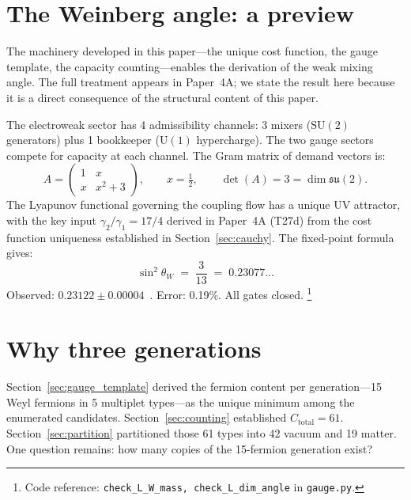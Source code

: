 \documentclass[11pt]{article}
\newcommand{\coderef}[2]{\footnote{Code reference: \texttt{#1} in \texttt{#2}.}}
\newcommand{\SU}{\mathrm{SU}}
\newcommand{\U}{\mathrm{U}}
\begin{document}
\section{The Weinberg angle: a preview}
\label{sec:weinberg}

The machinery developed in this paper---the unique cost function, the gauge template, the capacity counting---enables the derivation of the weak mixing angle.  The full treatment appears in Paper~4A; we state the result here because it is a direct consequence of the structural content of this paper.

The electroweak sector has 4 admissibility channels: 3 mixers ($\SU(2)$ generators) plus 1 bookkeeper ($\U(1)$ hypercharge).  The two gauge sectors compete for capacity at each channel.  The Gram matrix of demand vectors is:
\begin{equation}
A = \begin{pmatrix} 1 & x \\ x & x^2 + 3 \end{pmatrix}, \qquad x = \tfrac{1}{2}, \qquad \det(A) = 3 = \dim\mathfrak{su}(2).
\label{eq:weinberg_matrix}
\end{equation}
The Lyapunov functional governing the coupling flow has a unique UV attractor, with the key input $\gamma_2/\gamma_1 = 17/4$ derived in Paper~4A (T27d) from the cost function uniqueness established in Section~\ref{sec:cauchy}.  The fixed-point formula gives:
\begin{equation}
\sin^2\!\theta_W \;=\; \frac{3}{13} \;=\; 0.23077\ldots
\label{eq:weinberg_value}
\end{equation}
Observed: $0.23122 \pm 0.00004$~\cite{PDG2024}.  Error: 0.19\%.  All gates closed.
\coderef{check\_L\_W\_mass, check\_L\_dim\_angle}{gauge.py}


\section{Why three generations}
\label{sec:generations}

Section~\ref{sec:gauge_template} derived the fermion content per generation---15 Weyl fermions in 5 multiplet types---as the unique minimum among the enumerated candidates.  Section~\ref{sec:counting} established $C_{\mathrm{total}} = 61$.  Section~\ref{sec:partition} partitioned those 61 types into 42 vacuum and 19 matter.  One question remains: how many copies of the 15-fermion generation exist?
\end{document}
